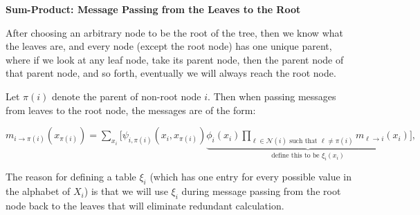 \documentclass[6008notes.tex]{subfiles}
\begin{document}
\textbf{Sum-Product: Message Passing from the Leaves to the Root}

After choosing an arbitrary node to be the root of the tree, then we know what the leaves are, and every node (except the root node) has one unique parent, where if we look at any leaf node, take its parent node, then the parent node of that parent node, and so forth, eventually we will always reach the root node.

Let $\pi(i)$ denote the parent of non-root node $i$. Then when passing messages from leaves to the root node, the messages are of the form:

{\centering$m_{i\rightarrow \pi (i)}(x_{\pi (i)})=\sum _{x_{i}}\bigg[\psi _{i,\pi (i)}(x_{i},x_{\pi (i)})\underbrace{\phi _{i}(x_{i})\prod _{\ell \in \mathcal{N}(i)\text { such that }\ell \ne \pi (i)}m_{\ell \rightarrow i}(x_{i})}_{\text {define this to be }\xi _ i(x_ i)}\bigg],$ \par}
 
The reason for defining a table $\xi_i$ (which has one entry for every possible value in the alphabet of $X_i$) is that we will use $\xi_i$ during message passing from the root node back to the leaves that will eliminate redundant calculation.
\end{document}
